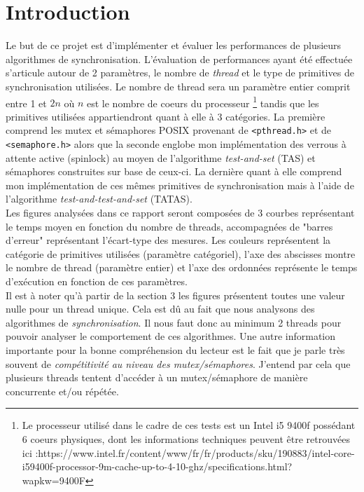\newpage

\section{Introduction}

Le but de ce projet est d'implémenter et évaluer les performances de plusieurs algorithmes de synchronisation.
L'évaluation de performances ayant été effectuée s'articule autour de 2 paramètres, le nombre de \textit{thread} et le type de primitives de synchronisation utilisées.
Le nombre de thread sera un paramètre entier comprit entre 1 et $2n$ où $n$ est le nombre de coeurs du processeur \footnote{Le processeur utilisé dans le cadre de ces tests est un Intel i5 9400f possédant 6 coeurs physiques, dont les informations techniques peuvent être retrouvées ici :https://www.intel.fr/content/www/fr/fr/products/sku/190883/intel-core-i59400f-processor-9m-cache-up-to-4-10-ghz/specifications.html?wapkw=9400F } tandis que les primitives utilisées appartiendront quant à elle à 3 catégories. 
La première comprend les mutex et sémaphores POSIX provenant de \texttt{<pthread.h>} et de \texttt{<semaphore.h>} alors que la seconde englobe mon implémentation des verrous à attente active (spinlock) au moyen de l'algorithme \textit{test-and-set} (TAS) et sémaphores construites sur base de ceux-ci. 
La dernière quant à elle comprend mon implémentation de ces mêmes primitives de synchronisation mais à l'aide de l'algorithme \textit{test-and-test-and-set} (TATAS).\\ 

\noindent Les figures analysées dans ce rapport seront composées de 3 courbes représentant le temps moyen en fonction du nombre de threads, accompagnées de "barres d'erreur" représentant l'écart-type des mesures.
Les couleurs représentent la catégorie de primitives utilisées (paramètre catégoriel), l'axe des abscisses montre le nombre de thread (paramètre entier) et l'axe des ordonnées représente le temps d'exécution en fonction de ces paramètres. \\

\noindent Il est à noter qu'à partir de la section 3 les figures présentent toutes une valeur nulle pour un thread unique. Cela est dû au fait que nous analysons des algorithmes de \textit{synchronisation}.
Il nous faut donc au minimum 2 threads pour pouvoir analyser le comportement de ces algorithmes. Une autre information importante pour la bonne compréhension du lecteur est le fait que je parle très souvent de \textit{compétitivité au niveau des mutex/sémaphores}. J'entend par cela que plusieurs threads tentent d'accéder à un mutex/sémaphore de manière concurrente et/ou répétée.

